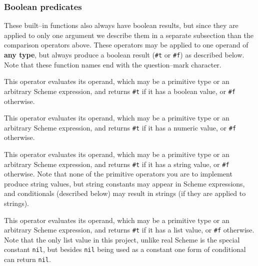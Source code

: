 \documentclass[11pt]{article}
\begin{document}
      \subsubsection{Boolean predicates}

        These built--in functions also always have boolean results, but since
      they are applied to only one argument we describe them in a separate
      subsection than the comparison operators above.  These operators may
      be applied to one operand of \textbf{any type}, but always produce a
      boolean result (\texttt{\#t} or \texttt{\#f}) as described below.
      Note that these function names end with the question--mark character.

        \vspace{-1.5mm}

        \begin{description}

          \addtolength{\itemsep}{-1mm}

          \item[\texttt{boolean?}:] This operator evaluates its operand,
                which may be a primitive type or an arbitrary Scheme
                expression, and returns \texttt{\#t} if it has a boolean
                value, or \texttt{\#f} otherwise.

          \item[\texttt{number?}:] This operator evaluates its operand,
                which may be a primitive type or an arbitrary Scheme
                expression, and returns \texttt{\#t} if it has a numeric
                value, or \texttt{\#f} otherwise.

          \item[\texttt{string?}:] This operator evaluates its operand,
                which may be a primitive type or an arbitrary Scheme
                expression, and returns \texttt{\#t} if it has a string
                value, or \texttt{\#f} otherwise.  Note that none of the
                primitive operators you are to implement produce string
                values, but string constants may appear in Scheme
                expressions, and conditionals (described below) may result
                in strings (if they are applied to strings).

          \item[\texttt{list?}:] This operator evaluates its operand,
                which may be a primitive type or an arbitrary Scheme
                expression, and returns \texttt{\#t} if it has a list
                value, or \texttt{\#f} otherwise.  Note that the only list
                value in this project, unlike real Scheme is the special
                constant \texttt{nil}, but besides \texttt{nil} being
                used as a constant one form of conditional can return
                \texttt{nil}.


\end{description}
\end{document}
